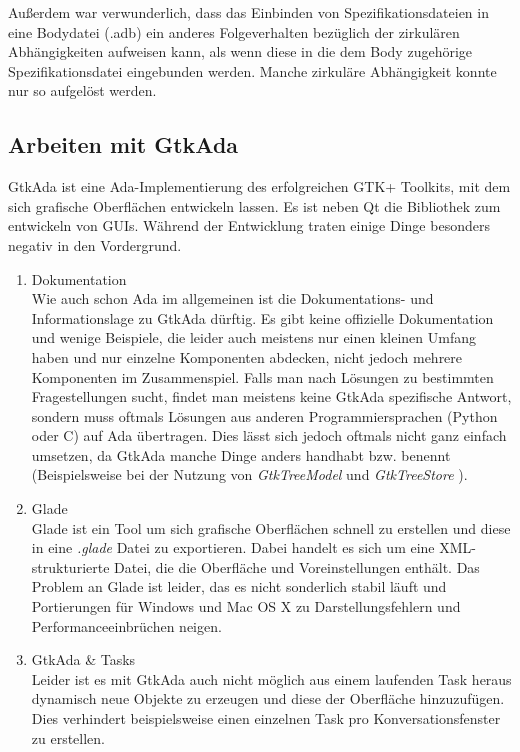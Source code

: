 \documentclass[12pt,a4paper,bibliography=totocnumbered,listof=totocnumbered]{scrartcl}
\begin{document}

Außerdem war verwunderlich, dass das Einbinden von Spezifikationsdateien in eine Bodydatei (.adb) ein anderes Folgeverhalten bezüglich der zirkulären Abhängigkeiten aufweisen kann, als wenn diese in die dem Body zugehörige Spezifikationsdatei eingebunden werden. Manche zirkuläre Abhängigkeit konnte nur so aufgelöst werden.

\subsection{Arbeiten mit GtkAda}
GtkAda ist eine Ada-Implementierung des erfolgreichen GTK+ Toolkits, mit dem sich grafische Oberflächen entwickeln lassen. Es ist neben Qt die Bibliothek zum entwickeln von GUIs. Während der Entwicklung traten einige Dinge besonders negativ in den Vordergrund.

\begin{enumerate}
	\item Dokumentation	\hfill \\
	Wie auch schon Ada im allgemeinen ist die Dokumentations- und Informationslage zu GtkAda dürftig. Es gibt keine offizielle Dokumentation und wenige Beispiele, die leider auch meistens nur einen kleinen Umfang haben und nur einzelne Komponenten abdecken, nicht jedoch mehrere Komponenten im Zusammenspiel. Falls man nach Lösungen zu bestimmten Fragestellungen sucht, findet man meistens keine GtkAda spezifische Antwort, sondern muss oftmals Lösungen aus anderen Programmiersprachen (Python oder C) auf Ada übertragen. Dies lässt sich jedoch oftmals nicht ganz einfach umsetzen, da GtkAda manche Dinge anders handhabt bzw. benennt (Beispielsweise bei der Nutzung von \textit{Gtk\textunderscore Tree\textunderscore Model} und \textit{Gtk\textunderscore Tree\textunderscore Store}  ).
	\item Glade \hfill \\
	Glade ist ein Tool um sich grafische Oberflächen schnell zu erstellen und diese in eine \textit{.glade} Datei zu exportieren. Dabei handelt es sich um eine XML-strukturierte Datei, die die Oberfläche und Voreinstellungen enthält. Das Problem an Glade ist leider, das es nicht sonderlich stabil läuft und Portierungen für Windows und Mac OS X zu Darstellungsfehlern und Performanceeinbrüchen neigen.
	\item GtkAda \& Tasks \hfill \\
	Leider ist es mit GtkAda auch nicht möglich aus einem laufenden Task heraus dynamisch neue Objekte zu erzeugen und diese der Oberfläche hinzuzufügen. Dies verhindert beispielsweise einen einzelnen Task pro Konversationsfenster zu erstellen.
	
	\end{enumerate}
\end{document}
